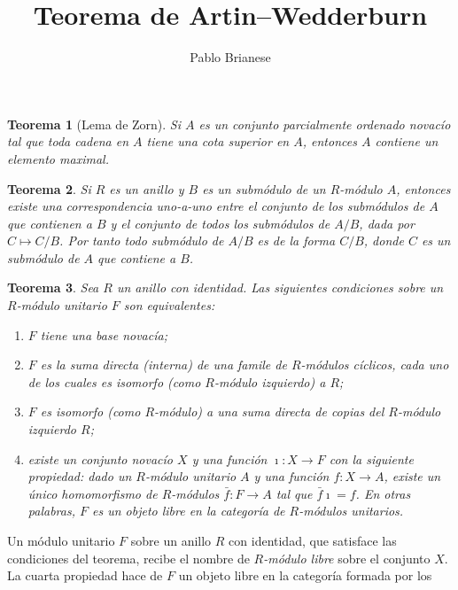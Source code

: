 \documentclass{report}
\title{Teorema de Artin--Wedderburn}
\author{Pablo Brianese}
\newtheorem{theorem}{Teorema}
\begin{document}
  \maketitle

  \begin{theorem}[Lema de Zorn]
    Si \(A\) es un conjunto parcialmente ordenado novacío tal que toda cadena en \(A\) tiene una cota superior en \(A\), entonces \(A\) contiene un elemento maximal.
  \end{theorem}

  \begin{theorem}
    \label{theorem:submodulesOfQuotientModule}
    Si \(R\) es un anillo y \(B\) es un submódulo de un \(R\)-módulo \(A\), entonces existe una correspondencia uno-a-uno entre el conjunto de los submódulos de \(A\) que contienen a \(B\) y el conjunto de todos los submódulos de \(A / B\), dada por \(C \mapsto C / B\).
    Por tanto todo submódulo de \(A / B\) es de la forma \(C / B\), donde \(C\) es un submódulo de \(A\) que contiene a \(B\).
  \end{theorem}

  \begin{theorem}
    \label{theorem:freeUnitalModulesOverARingWithIdentity}
    Sea \(R\) un anillo con identidad.
    Las siguientes condiciones sobre un \(R\)-módulo unitario \(F\) son equivalentes:
    \begin{enumerate}
      \item \(F\) tiene una base novacía;
      \item \(F\) es la suma directa (interna) de una famile de \(R\)-módulos cíclicos, cada uno de los cuales es isomorfo (como \(R\)-módulo izquierdo) a \(R\);
      \item \(F\) es isomorfo (como \(R\)-módulo) a una suma directa de copias del \(R\)-módulo izquierdo \(R\);
      \item existe un conjunto novacío \(X\) y una función \(\imath : X \rightarrow F\) con la siguiente propiedad:
      dado un \(R\)-módulo unitario \(A\) y una función \(f : X \rightarrow A\), existe un único homomorfismo de \(R\)-módulos \(\bar{f} : F \rightarrow A\) tal que \(\bar{f} \imath = f\).
      En otras palabras, \(F\) es un objeto libre en la categoría de \(R\)-módulos unitarios.
    \end{enumerate}
  \end{theorem}

  Un módulo unitario \(F\) sobre un anillo \(R\) con identidad, que satisface las condiciones del teorema, recibe el nombre de \emph{\(R\)-módulo libre} sobre el conjunto \(X\).
  La cuarta propiedad hace de \(F\) un objeto libre en la categoría formada por los 
\end{document}
